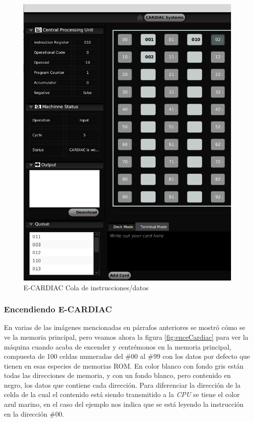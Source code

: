 \documentclass[letterpaper,12pt,oneside]{book}
\begin{document}
	\begin{figure}[H]
 			\centering
			\includegraphics[scale=0.4]{media/ECARDIAC/QueueCargada.png}
			\caption{E-CARDIAC Cola de instrucciones/datos}
			\label{fig:ecardiacQueue}
	\end{figure}		

 \subsubsection{Encendiendo E-CARDIAC}

	En varias de las imágenes mencionadas en párrafos anteriores se mostró cómo se ve la memoria principal, pero veamos ahora la figura \ref{fig:enceCardiac} para
	ver la máquina cuando acaba de encender y centrémonos en la memoria principal, compuesta de 100 celdas numeradas del \#00 al \#99 con los datos
	por defecto que tienen en esas especies de memorias ROM. En color blanco con fondo gris están todas las direcciones de memoria, y con un fondo blanco, pero
	contenido en negro, los datos que contiene cada dirección. Para diferenciar la dirección de la celda de la cual el contenido está siendo transmitido
	a la \textit{CPU} se tiene el color azul marino, en el caso del ejemplo nos indica que se está leyendo la instrucción en la dirección \#00.
	
\end{document}

